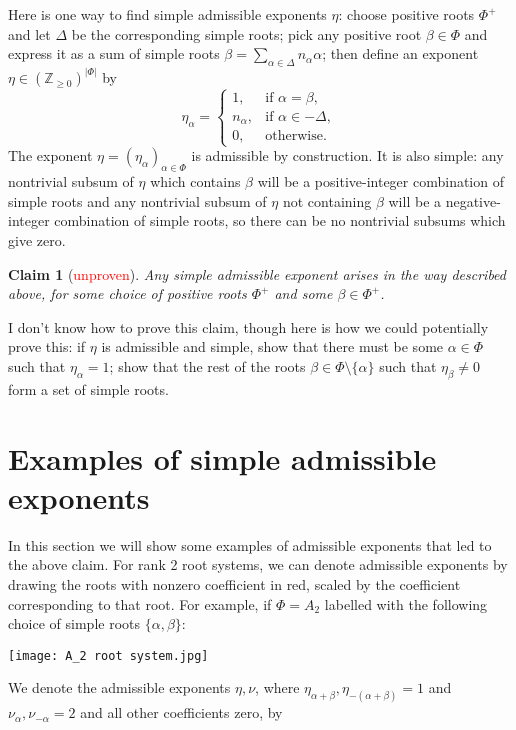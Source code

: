 \documentclass[12pt]{amsart}
\newcommand{\Z}{\mathbb{Z}}
\newtheorem*{claim}{Claim}
\theoremstyle{remark}
\theoremstyle{remark}
\theoremstyle{remark}
\begin{document}
Here is one way to find simple admissible exponents $\eta$:
choose positive roots $\Phi^+$ and let $\Delta$ be the corresponding simple roots;
pick any positive root $\beta \in \Phi$ and express it as a sum of simple roots $\beta=\sum_{\alpha\in\Delta} n_\alpha \alpha$;
then define an exponent $\eta \in (\Z_{\ge 0})^{|\Phi|}$ by
$$
\eta_\alpha = \begin{cases}
    1, & \text{if } \alpha = \beta, \\
    n_\alpha, & \text{if } \alpha \in - \Delta, \\
    0, & \text{otherwise.}
\end{cases}$$
The exponent $\eta=(\eta_\alpha)_{\alpha\in\Phi}$ is admissible by construction.
It is also simple: any nontrivial subsum of $\eta$ which contains $\beta$ will be a positive-integer combination of simple roots and any nontrivial subsum of $\eta$ not containing $\beta$ will be a negative-integer combination of simple roots, so there can be no nontrivial subsums which give zero.

\begin{claim}[\textcolor{red}{unproven}]
Any simple admissible exponent arises in the way described above, for some choice of positive roots $\Phi^+$ and some $\beta \in \Phi^+$.
\end{claim}

I don't know how to prove this claim, though here is how we could potentially prove this:
if $\eta$ is admissible and simple, show that there must be some $\alpha \in \Phi$ such that $\eta_\alpha=1$;
show that the rest of the roots $\beta\in\Phi\setminus\{\alpha\}$ such that $\eta_\beta\ne0$ form a set of simple roots.

\section*{Examples of simple admissible exponents}
In this section we will show some examples of admissible exponents that led to the above claim.
For rank 2 root systems, we can denote admissible exponents by drawing the roots with nonzero coefficient in red, scaled by the coefficient corresponding to that root.
For example, if $\Phi=A_2$ labelled with the following choice of simple roots $\{\alpha, \beta\}$:

\centerline{\texttt{[image: A\_2 root system.jpg]}}

\noindent
We denote the admissible exponents $\eta, \nu$, where $\eta_{\alpha+\beta}, \eta_{-(\alpha+\beta)}=1$ and $\nu_{\alpha}, \nu_{-\alpha}=2$ and all other coefficients zero, by
\end{document}
